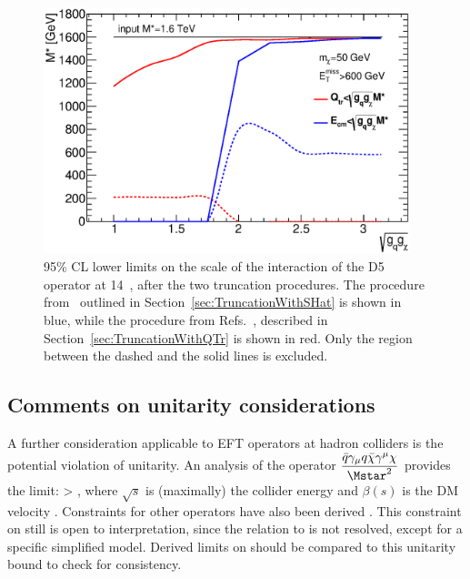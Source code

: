 \begin{figure}
	\centering
	\includegraphics[width=0.95\textwidth]{figures/EFT/MstarvsCouplingSel600_DM_EFT_D5_DM50}
	\caption{95\% CL lower limits on the scale of the interaction of the D5 operator at 14~\tev, after the two truncation procedures. 
		The procedure from~\cite{Racco:2015dxa} outlined in Section~\ref{sec:TruncationWithSHat} is shown in blue, while the procedure from Refs.~\cite{Busoni:2014sya,Aad:2015zva}, described in Section~\ref{sec:TruncationWithQTr} is shown in red. Only the region between the dashed and the solid lines is excluded.}
	\label{fig:monojet_MstarMmed}
\end{figure}


\subsection{Comments on unitarity considerations}

A further consideration applicable to EFT operators at hadron colliders
is the potential violation of unitarity.  An analysis of the operator
$\displaystyle {\bar{q}\gamma_\mu q\bar\chi\gamma^\mu\chi \over \Mstar^2}$
provides the limit:
\be
\Mstar >  ,
\ee
where $\sqrt{s}$ is (maximally) the collider energy and $\beta(s)$ is
the DM velocity \cite{Shoemaker:2011vi}.
Constraints for other operators have also been derived \cite{Endo:2014mja}.
This constraint on \Mstar still is open to interpretation, since the
relation to \Mcut is not resolved, except for a specific simplified model.
Derived limits on \Mstar should be compared to this unitarity bound to
check for consistency.


